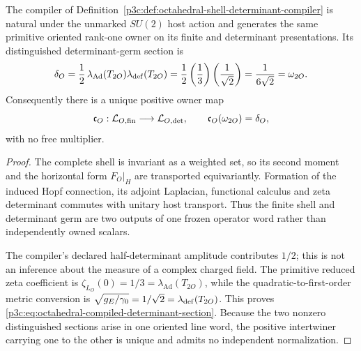 \documentclass[12pt,a4paper]{article}
\begin{document}
\begin{theorem}
\label{p3c:thm:canonical-octahedral-owner-intertwiner}
The compiler of
Definition~\ref{p3c:def:octahedral-shell-determinant-compiler} is natural
under the unmarked \(SU(2)\) host action and generates the same primitive
oriented rank-one owner on its finite and determinant presentations.  Its
distinguished determinant-germ section is
\begin{equation}
\label{p3c:eq:octahedral-compiled-determinant-section}
 \delta_O
 =\frac12\,\lambda_{\operatorname{Ad}}(T_{2O})
              \lambda_{\rm def}(T_{2O})
 =\frac12\left(\frac13\right)\left(\frac1{\sqrt2}\right)
 =\frac1{6\sqrt2}
 =\omega_{2O}.
\end{equation}
Consequently there is a unique positive owner map
\[
 \mathfrak c_O:\mathcal L_{O,\rm fin}
 \longrightarrow\mathcal L_{O,\det},
 \qquad
 \mathfrak c_O(\omega_{2O})=\delta_O ,
\]
with no free multiplier.
\end{theorem}

\begin{proof}
The complete shell is invariant as a weighted set, so its second moment and
the horizontal form \(F_O|_H\) are transported equivariantly.  Formation of
the induced Hopf connection, its adjoint Laplacian, functional calculus and
zeta determinant commutes with unitary host transport.  Thus the finite shell
and determinant germ are two outputs of one frozen operator word rather than
independently owned scalars.

The compiler's declared half-determinant amplitude contributes \(1/2\); this is not an inference about the measure of a complex charged field.  The primitive reduced zeta
coefficient is
\(\zeta_{L_O}(0)=1/3=\lambda_{\operatorname{Ad}}(T_{2O})\), while the
quadratic-to-first-order metric conversion is
\(\sqrt{g_E/\gamma_0}=1/\sqrt2=\lambda_{\rm def}(T_{2O})\).
This proves
\eqref{p3c:eq:octahedral-compiled-determinant-section}.  Because the two
nonzero distinguished sections arise in one oriented line word, the positive
intertwiner carrying one to the other is unique and admits no independent
normalization.
\end{proof}
\end{document}
